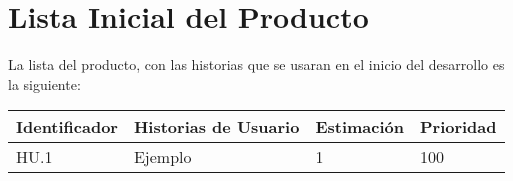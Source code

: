 \section{Lista Inicial del Producto}

La lista del producto, con las historias que se usaran en el inicio del desarrollo es la siguiente:\\

\begin{table}[h]
	\centering
	\begin{tabular}{| p{2.3cm} | p{5.1cm} | p{2cm} | p{1.6cm} |}
		\rowcolor[HTML]{329A9D} 
		{\color[HTML]{FFFFFF} \textbf{Identificador}} & {\color[HTML]{FFFFFF} \textbf{Historias de Usuario}} & {\color[HTML]{FFFFFF} \textbf{Estimación}} & {\color[HTML]{FFFFFF} \textbf{Prioridad}} \\ \hline
		HU.1 & Ejemplo & 1 & 100 \\         
		\hline              
	\end{tabular}
\end{table}


\newpage

\newpage

\newpage

